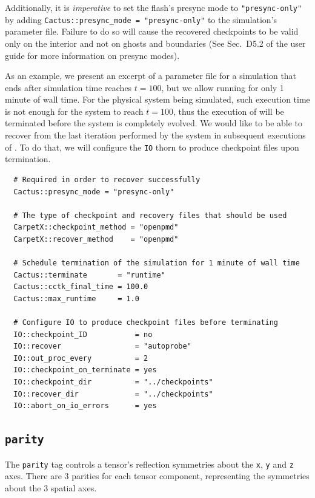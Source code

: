 Additionally, it is \textit{imperative} to set the flash's presync mode to \texttt{"presync-only"} by adding \texttt{Cactus::presync\_mode = "presync-only"} to the simulation's parameter file. Failure to do so will cause the recovered checkpoints to be valid only on the interior and not on ghosts and boundaries (See Sec.~D5.2 of the \Cactus\space user guide for more information on presync modes).

As an example, we present an excerpt of a parameter file for a simulation that ends after simulation time reaches $t=100$, but we allow \Cactus\space running for only 1 minute of wall time. For the physical system being simulated, such execution time is not enough for the system to reach $t=100$, thus the execution of \Cactus\space will be terminated before the system is completely evolved. We would like to be able to recover from the last iteration performed by the system in subsequent executions of \Cactus. To do that, we will configure the \texttt{IO} thorn to produce checkpoint files upon \Cactus\space termination.

\begin{verbatim}
  # Required in order to recover successfully
  Cactus::presync_mode = "presync-only"

  # The type of checkpoint and recovery files that should be used
  CarpetX::checkpoint_method = "openpmd"
  CarpetX::recover_method    = "openpmd"

  # Schedule termination of the simulation for 1 minute of wall time
  Cactus::terminate       = "runtime"
  Cactus::cctk_final_time = 100.0
  Cactus::max_runtime     = 1.0

  # Configure IO to produce checkpoint files before terminating
  IO::checkpoint_ID           = no
  IO::recover                 = "autoprobe"
  IO::out_proc_every          = 2
  IO::checkpoint_on_terminate = yes
  IO::checkpoint_dir          = "../checkpoints"
  IO::recover_dir             = "../checkpoints"
  IO::abort_on_io_errors      = yes
\end{verbatim}

\subsection{\texttt{parity}}
The \texttt{parity} tag controls a tensor's reflection symmetries about the \texttt{x}, \texttt{y} and \texttt{z} axes. There are 3 parities for each tensor component, representing the symmetries about the 3 spatial axes.


